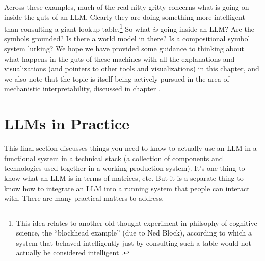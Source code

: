 Across these examples, much of the real nitty gritty concerns what is going on
inside the guts of an LLM. Clearly they are doing something more intelligent
than consulting a giant lookup table.\footnote{This idea relates to another old
thought experiment in philsophy of cognitive science, the ``blockhead example''
(due to Ned Block), according to which a system that behaved intelligently just
by consulting such a table would not actually be considered intelligent
\cite{milliere2024philosophical1}.} So what \emph{is} going inside an LLM? Are
the symbols grounded? Is there a world model in there? Is a compositional
symbol system lurking?  We hope we have provided some guidance to thinking
about what happens in the guts of these machines with all the explanations and
visualizations (and pointers to other tools and visualizations) in this
chapter, and we also note that the topic is itself being actively pursued in
the area of mechanistic interpretability, discussed in chapter
. 




\section{LLMs in Practice}\label{transformersInPractice}

This final section discusses things you need to know to actually use an LLM in
a functional system in a technical stack (a collection of components and
technologies used together in a working production system).  It's one thing to
know what an LLM is in terms of matrices, etc.  But it is a separate thing to
know how to integrate an LLM into a running system that people can interact
with.  There are many practical matters to address.

